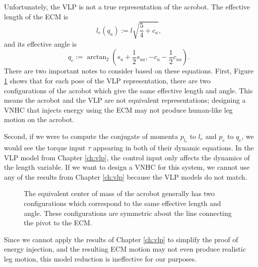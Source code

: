 Unfortunately, the VLP is not a true representation of the acrobot.
The effective length of the ECM is 
\[
    l_e(q_a) := l\sqrt{\frac{5}{4} + c_a}
    ,
\]
and its effective angle is
\[
    q_e := \arctan_2\left(s_u + \frac{1}{2}s_{ua}, -c_u - \frac{1}{2}c_{ua}\right)
    .
\]
There are two important notes to consider based on these equations. 
First, Figure \ref{fig:acrobot-vlp-symmetry} shows that for each pose of the
VLP representation, there are two configurations
of the acrobot which give the same effective length and angle.
This means the acrobot and the VLP are not equivalent representations;
designing a VNHC that injects energy using the ECM may not produce human-like
leg motion on the acrobot.

Second, if we were to compute the conjugate of momenta
\(p_{l_e}\) to \(l_e\) and \(p_e\) to \(q_e\), we would see the torque input
\(\tau\) appearing in both of their dynamic equations.
In the VLP model from Chapter \ref{ch:vlp}, the control input only
affects the dynamics of the length variable.
If we want to design a VNHC for this system, we cannot use any of the results
from Chapter \ref{ch:vlp} because the VLP models do not match.

\begin{figure}
    \centering
    
    \caption{The equivalent center of mass of the acrobot generally has two configurations
        which correspond to the same effective length and angle. These
        configurations are symmetric about the line connecting the pivot to the
        ECM.}
    \label{fig:acrobot-vlp-symmetry}
\end{figure}

Since we cannot apply the results of Chapter \ref{ch:vlp} to simplify the proof
of energy injection, and the resulting ECM motion may not even produce
realistic leg motion, this model reduction is ineffective for our purposes. 

